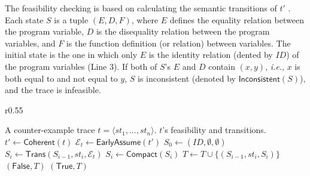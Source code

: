 The feasibility checking is based on calculating the semantic transitions of $t'$ \cite{POPL19,fm}. Each state $S$ is a tuple $(E, D, F)$, where $E$ defines the equality relation between the program variable, $D$ is the disequality relation between the program variables, and $F$ is the function definition (or relation) between variables. The initial state is the one in which only $E$ is the identity relation (dented by $\mathit{ID}$) of the program variables (Line 3). If both of $S$'s $E$ and $D$ contain $(x, y)$, \emph{i.e.}, $x$ is both equal to and not equal to $y$, $S$ is inconsistent (denoted by $\mathsf{Inconsistent}(S)$), and the trace is infeasible.

\begin{wrapfigure}{r}{0.55\textwidth}
	\begin{minipage}{0.55\textwidth}
	\vspace{-1.5cm}
	\begin{algorithm}[H]
	\caption{$\mathsf{Feasible}(t)$}
		\label{alg:feasible}
		\begin{algorithmic}[1]
			\REQUIRE A counter-example trace $t = \langle st_1, ..., st_n\rangle$.
			\ENSURE $t$'s feasibility and transitions.
			\STATE $t' \gets \mathsf{Coherent}(t)$
			\STATE $\mathcal{E}_{t} \gets \mathsf{EarlyAssume}(t')$
			\STATE $S_0 \gets (\mathit{ID}, \emptyset, \emptyset)$
				\STATE $S_i \gets \mathsf{Trans}(S_{i-1}, st_i, \mathcal{E}_t)$
				\STATE $S_i \gets \mathsf{Compact}(S_i)$
				\STATE $T \gets T \cup \{(S_{i-1}, st_i, S_{i})\}$
					\RETURN $(\mathsf{False}, T)$
				\ENDIF
			\ENDFOR
			\RETURN $(\mathsf{True}, T)$
		\end{algorithmic}
	\end{algorithm}
	\vspace{-1.3cm}
	\end{minipage}
	\end{wrapfigure}

